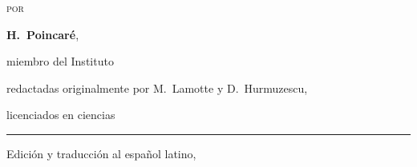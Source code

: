 \begin{titlepage}
{\scshape por\par}
\vspace{4pt}
{\Large\bfseries H.\ Poincaré}, {\small miembro del Instituto\par}

\vspace{6pt}
{\footnotesize redactadas originalmente por M.\ Lamotte y D.\ Hurmuzescu,\par
licenciados en ciencias\par}

\vfill

\color{rojopoincare}\rule{0.35\textwidth}{0.6pt}\color{black}

\vspace{14pt}
{\footnotesize Edición y traducción al español latino, \the\year\par}

\end{titlepage}
